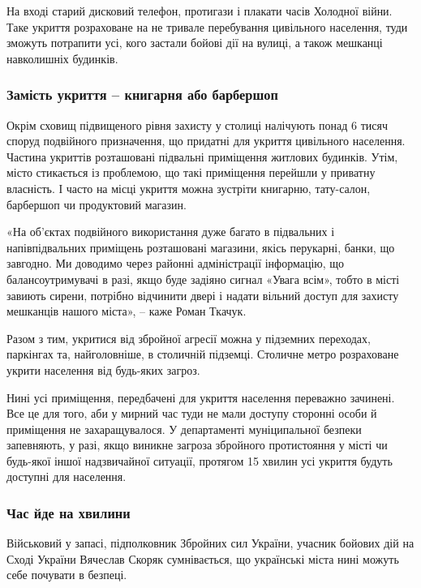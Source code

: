 На вході старий дисковий телефон, протигази і плакати часів Холодної війни.
Таке укриття розраховане на не тривале перебування цивільного населення, туди
зможуть потрапити усі, кого застали бойові дії на вулиці, а також мешканці
навколишніх будинків.

\subsubsection{Замість укриття – книгарня або барбершоп}

Окрім сховищ підвищеного рівня захисту у столиці налічують понад 6 тисяч споруд
подвійного призначення, що придатні для укриття цивільного населення. Частина
укриттів розташовані підвальні приміщення житлових будинків. Утім, місто
стикається із проблемою, що такі приміщення перейшли у приватну власність. І
часто на місці укриття можна зустріти книгарню, тату-салон, барбершоп чи
продуктовий магазин.

«На об’єктах подвійного використання дуже багато в підвальних і напівпідвальних
приміщень розташовані магазини, якісь перукарні, банки, що завгодно. Ми
доводимо через районні адміністрації інформацію, що балансоутримувачі в разі,
якщо буде задіяно сигнал «Увага всім», тобто в місті завиють сирени, потрібно
відчинити двері і надати вільний доступ для захисту мешканців нашого міста»,
– каже Роман Ткачук. 


Разом з тим, укритися від збройної агресії можна у підземних переходах,
паркінгах та, найголовніше, в столичній підземці. Столичне метро розраховане
укрити населення від будь-яких загроз.

Нині усі приміщення, передбачені для укриття населення переважно зачинені. Все
це для того, аби у мирний час туди не мали доступу сторонні особи й приміщення
не захаращувалося. У департаменті муніципальної безпеки запевняють, у разі,
якщо виникне загроза збройного протистояння у місті чи будь-якої іншої
надзвичайної ситуації, протягом 15 хвилин усі укриття будуть доступні для
населення.

\subsubsection{Час йде на хвилини}

Військовий у запасі, підполковник Збройних сил України, учасник бойових дій на
Сході України Вячеслав Скоряк сумнівається, що українські міста нині можуть
себе почувати в безпеці.


